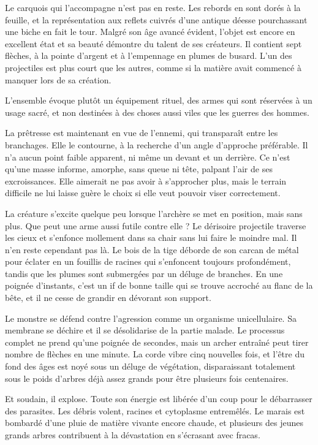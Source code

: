 \documentclass{report}
\begin{document}
Le carquois qui l'accompagne n'est pas en reste. Les rebords en sont dorés à la feuille, et la représentation aux reflets cuivrés d'une antique déesse pourchassant une biche en fait le tour. Malgré son âge avancé évident, l'objet est encore en excellent état et sa beauté démontre du talent de ses créateurs. Il contient sept flèches, à la pointe d'argent et à l'empennage en plumes de busard. L'un des projectiles est plus court que les autres, comme si la matière avait commencé à manquer lors de sa création. 

L'ensemble évoque plutôt un équipement rituel, des armes qui sont réservées à un usage sacré, et non destinées à  des choses aussi viles que les guerres des hommes.

La prêtresse est maintenant en vue de l'ennemi, qui transparaît entre les branchages. Elle le contourne, à la recherche d'un angle d'approche préférable. Il n'a aucun point faible apparent, ni même un devant et un derrière. Ce n'est qu'une masse informe, amorphe, sans queue ni tête, palpant l'air de ses excroissances. Elle aimerait ne pas avoir à s'approcher plus, mais le terrain difficile ne lui laisse guère le choix si elle veut pouvoir viser correctement. 

La créature s'excite quelque peu lorsque l'archère se met en position, mais sans plus. Que peut une arme aussi futile contre elle ? Le dérisoire projectile traverse les cieux et s'enfonce mollement dans sa chair sans lui faire le moindre mal. Il n'en reste cependant pas là. Le bois de la tige déborde de son carcan de métal pour éclater en un fouillis de racines qui s'enfoncent toujours profondément, tandis que les plumes sont submergées par un déluge de branches. En une poignée d'instants, c'est un if de bonne taille qui se trouve accroché au flanc de la bête, et il ne cesse de grandir en dévorant son support. 

Le monstre se défend contre l'agression comme un organisme unicellulaire. Sa membrane se déchire et il se désolidarise de la partie malade. Le processus complet ne prend qu'une poignée de secondes, mais un archer entraîné peut tirer nombre de flèches en une minute. La corde vibre cinq nouvelles fois, et l'être du fond des âges est noyé sous un déluge de végétation, disparaissant totalement sous le poids d'arbres déjà assez grands pour être plusieurs fois centenaires. 

Et soudain, il explose. Toute son énergie est libérée d'un coup pour le débarrasser des parasites. Les débris volent, racines et cytoplasme entremêlés. Le marais est bombardé d'une pluie de matière vivante encore chaude, et plusieurs des jeunes grands arbres contribuent à la dévastation en s'écrasant avec fracas.
\end{document}
